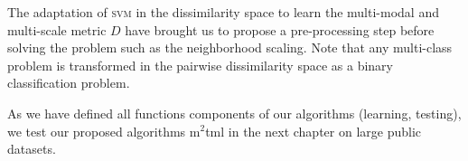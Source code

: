 \noindent The adaptation of \textsc{svm} in the dissimilarity space to learn the multi-modal and multi-scale metric $D$ have brought us to propose a pre-processing step before solving the problem such as the neighborhood scaling. Note that any multi-class problem is transformed in the pairwise dissimilarity space as a binary classification problem.

\noindent As we have defined all functions components of our algorithms (learning, testing), we test our proposed algorithms {\sc m}$^2${\sc tml} in the next chapter on large public datasets. 



%
